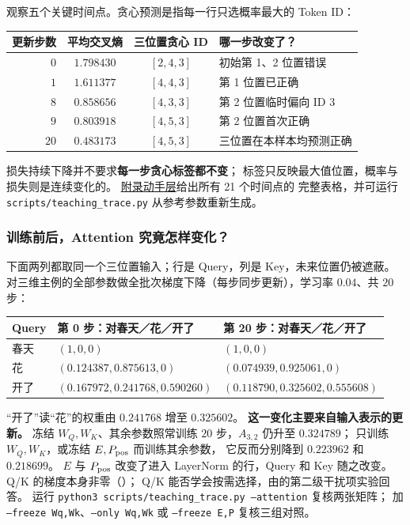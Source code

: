 \par\medskip


观察五个关键时间点。贪心预测是指每一行只选概率最大的 Token ID：
\begin{center}\small
{}
\begin{tabularx}{\linewidth}{@{}rccX@{}}
\toprule
更新步数 & 平均交叉熵 & 三位置贪心 ID & 哪一步改变了？\\\midrule
$0$ & $1.798430$ & $[2,4,3]$ & 初始第 1、2 位置错误\\
$1$ & $1.611377$ & $[4,4,3]$ & 第 1 位置已正确\\
$8$ & $0.858656$ & $[4,3,3]$ & 第 2 位置临时偏向 ID 3\\
$9$ & $0.803918$ & $[4,5,3]$ & 第 2 位置首次正确\\
$20$ & $0.483173$ & $[4,5,3]$ & 三位置在本样本均预测正确\\
\bottomrule
\end{tabularx}
\end{center}
损失持续下降并不要求\textbf{每一步贪心标签都不变}；
标签只反映最大值位置，概率与损失则是连续变化的。
\hyperref[app:pytorch-lab]{附录动手层}给出所有 21 个时间点的
完整表格，并可运行 \texttt{scripts/teaching\_trace.py} 从参考参数重新生成。


\subsubsection*{训练前后，Attention 究竟怎样变化？}
下面两列都取同一个三位置输入；行是 Query，列是 Key，未来位置仍被遮蔽。
对三维主例的全部参数做全批次梯度下降（每步同步更新），学习率 $0.04$、共 $20$ 步：
\begin{center}\small
{}
\begin{tabularx}{\linewidth}{@{}p{23mm}XX@{}}\toprule
Query & 第 0 步：对春天／花／开了 & 第 20 步：对春天／花／开了\\\midrule
春天 & $(1,0,0)$ & $(1,0,0)$\\
花 & $(0.124387,0.875613,0)$ & $(0.074939,0.925061,0)$\\
开了 & $(0.167972,0.241768,0.590260)$ & $(0.118790,0.325602,0.555608)$\\\bottomrule
\end{tabularx}
\end{center}
“开了”读“花”的权重由 $0.241768$ 增至 $0.325602$。
\textbf{这一变化主要来自输入表示的更新。}
冻结 $W_Q,W_K$、其余参数照常训练 $20$ 步，$A_{3,2}$ 仍升至 $0.324789$；
只训练 $W_Q,W_K$，或冻结 $E,P_{\rm pos}$ 而训练其余参数，
它反而分别降到 $0.223962$ 和 $0.218699$。
$E$ 与 $P_{\rm pos}$ 改变了进入 LayerNorm 的行，Query 和 Key 随之改变。
Q/K 的梯度本身非零（）；
Q/K 能否学会按需选择，由的第二级干扰项实验回答。
运行 \texttt{python3 scripts/teaching\_trace.py --attention} 复核两张矩阵；
加 \texttt{--freeze Wq,Wk}、\texttt{--only Wq,Wk} 或 \texttt{--freeze E,P} 复核三组对照。

